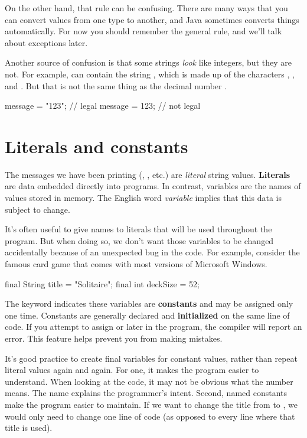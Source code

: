 On the other hand, that rule can be confusing.
There are many ways that you can convert values from one type to another, and Java sometimes converts things automatically.
For now you should remember the general rule, and we'll talk about exceptions later.

Another source of confusion is that some strings {\em look} like integers, but they are not.
For example,  can contain the string , which is made up of the characters , , and .
But that is not the same thing as the decimal number .

\begin{code}
    message = "123";  // legal
    message = 123;    // not legal
\end{code}


\section{Literals and constants}


The messages we have been printing (, , etc.) are {\em literal} string values.
{\bf Literals} are data embedded directly into programs.
In contrast, variables are the names of values stored in memory.
The English word {\em variable} implies that this data is subject to change.

It's often useful to give names to literals that will be used throughout the program.
But when doing so, we don't want those variables to be changed accidentally because of an unexpected bug in the code.
For example, consider the famous card game that comes with most versions of Microsoft Windows.

\begin{code}
    final String title = "Solitaire";
    final int deckSize = 52;
\end{code}


The keyword  indicates these variables are {\bf constants} and may be assigned only one time.
Constants are generally declared and {\bf initialized} on the same line of code.
If you attempt to assign  or  later in the program, the compiler will report an error.
This feature helps prevent you from making mistakes.

It's good practice to create final variables for constant values, rather than repeat literal values again and again.
For one, it makes the program easier to understand.
When looking at the code, it may not be obvious what the number  means.
The name  explains the programmer's intent.
Second, named constants make the program easier to maintain.
If we want to change the title from  to , we would only need to change one line of code (as opposed to every line where that title is used).


